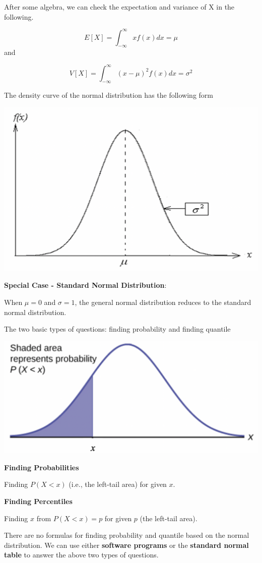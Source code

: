 \documentclass[
]{book}
\begin{document}
After some algebra, we can check the expectation and variance of X in the following.

\[
E[X] = \int_{-\infty}^\infty xf(x)dx = \mu
\]
and

\[
V[X] = \int_{-\infty}^\infty (x-\mu)^2f(x)dx = \sigma^2 
\]

The density curve of the normal distribution has the following form

\begin{center}\includegraphics[width=0.4\linewidth]{topic03/normalDensity} \end{center}

\textbf{Special Case - Standard Normal Distribution}:

When \(\mu = 0\) and \(\sigma = 1\), the general normal distribution reduces to the standard normal distribution.

\hfill\break

The two basic types of questions: finding probability and finding quantile

\hfill\break

\begin{center}\includegraphics[width=0.4\linewidth]{topic03/normalTailArea} \end{center}

\textbf{Finding Probabilities}

Finding \(P(X < x)\) (i.e., the left-tail area) for given \(x\).

\textbf{Finding Percentiles}

Finding \(x\) from \(P(X<x) = p\) for given \(p\) (the left-tail area).

There are no formulas for finding probability and quantile based on the normal distribution. We can use either \textbf{software programs} or the \textbf{standard normal table} to answer the above two types of questions.
\end{document}
